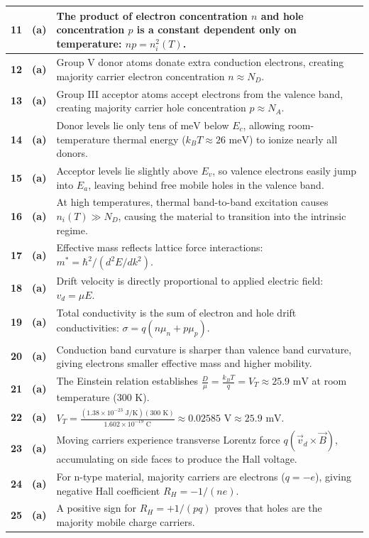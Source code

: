 {\begin{tabularx}{\textwidth}{|c|c|X|}
\textbf{11} & \textbf{(a)} & The product of electron concentration $n$ and hole concentration $p$ is a constant dependent only on temperature: $n p = n_i^2(T)$. \\ \hline
\textbf{12} & \textbf{(a)} & Group V donor atoms donate extra conduction electrons, creating majority carrier electron concentration $n \approx N_D$. \\ \hline
\textbf{13} & \textbf{(a)} & Group III acceptor atoms accept electrons from the valence band, creating majority carrier hole concentration $p \approx N_A$. \\ \hline
\textbf{14} & \textbf{(a)} & Donor levels lie only tens of $\text{meV}$ below $E_c$, allowing room-temperature thermal energy ($k_BT \approx 26\text{ meV}$) to ionize nearly all donors. \\ \hline
\textbf{15} & \textbf{(a)} & Acceptor levels lie slightly above $E_v$, so valence electrons easily jump into $E_a$, leaving behind free mobile holes in the valence band. \\ \hline
\textbf{16} & \textbf{(a)} & At high temperatures, thermal band-to-band excitation causes $n_i(T) \gg N_D$, causing the material to transition into the intrinsic regime. \\ \hline
\textbf{17} & \textbf{(a)} & Effective mass reflects lattice force interactions: $m^* = \hbar^2 / (d^2E/dk^2)$. \\ \hline
\textbf{18} & \textbf{(a)} & Drift velocity is directly proportional to applied electric field: $v_d = \mu E$. \\ \hline
\textbf{19} & \textbf{(a)} & Total conductivity is the sum of electron and hole drift conductivities: $\sigma = q(n\mu_n + p\mu_p)$. \\ \hline
\textbf{20} & \textbf{(a)} & Conduction band curvature is sharper than valence band curvature, giving electrons smaller effective mass and higher mobility. \\ \hline
\textbf{21} & \textbf{(a)} & The Einstein relation establishes $\frac{D}{\mu} = \frac{k_BT}{q} = V_T \approx 25.9\text{ mV}$ at room temperature ($300\text{ K}$). \\ \hline
\textbf{22} & \textbf{(a)} & $V_T = \frac{(1.38 \times 10^{-23}\text{ J/K})(300\text{ K})}{1.602 \times 10^{-19}\text{ C}} \approx 0.02585\text{ V} \approx 25.9\text{ mV}$. \\ \hline
\textbf{23} & \textbf{(a)} & Moving carriers experience transverse Lorentz force $q(\vec{v}_d \times \vec{B})$, accumulating on side faces to produce the Hall voltage. \\ \hline
\textbf{24} & \textbf{(a)} & For n-type material, majority carriers are electrons ($q = -e$), giving negative Hall coefficient $R_H = -1/(ne)$. \\ \hline
\textbf{25} & \textbf{(a)} & A positive sign for $R_H = +1/(pq)$ proves that holes are the majority mobile charge carriers. \\ \hline
\end{tabularx}
}

